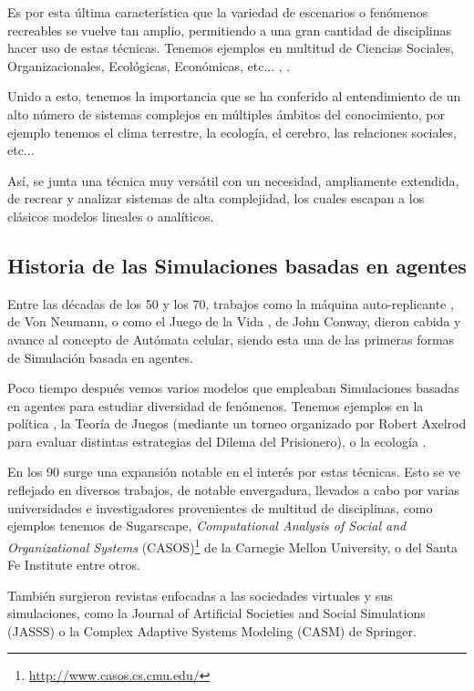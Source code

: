 Es por esta última característica que la variedad de escenarios o fenómenos recreables se vuelve tan amplio, permitiendo a una gran cantidad de disciplinas hacer uso de estas técnicas. Tenemos ejemplos en multitud de Ciencias Sociales, Organizacionales, Ecológicas, Económicas, etc... \citep{troitzsch2009perspectives}, \citep{heckbert2010agent}.

Unido a esto, tenemos la importancia que se ha conferido al entendimiento de un alto número de sistemas complejos en múltiples ámbitos del conocimiento, por ejemplo tenemos el clima terrestre, la ecología, el cerebro, las relaciones sociales, etc...

Así, se junta una técnica muy versátil con un necesidad, ampliamente extendida, de recrear y analizar sistemas de alta complejidad, los cuales escapan a los clásicos modelos lineales o analíticos.

\subsection{Historia de las Simulaciones basadas en agentes}

Entre las décadas de los 50 y los 70, trabajos como la máquina auto-replicante \citep{neumann1966theory} , de Von Neumann, o como el Juego de la Vida \citep{gardner1970fantastic}, de John Conway, dieron cabida y avance al concepto de Autómata celular, siendo esta una de las primeras formas de Simulación basada en agentes.

Poco tiempo después vemos varios modelos que empleaban Simulaciones basadas en agentes para estudiar diversidad de fenómenos. Tenemos ejemplos en la política \citep{schelling1971dynamic}, la Teoría de Juegos (mediante un torneo organizado por Robert Axelrod para evaluar distintas estrategias del Dilema del Prisionero), o la ecología \citep{hogeweg1983ontogeny}.

En los 90 surge una expansión notable en el interés por estas técnicas. Esto se ve reflejado en diversos trabajos, de notable envergadura, llevados a cabo por varias universidades e investigadores provenientes de multitud de disciplinas, como ejemplos tenemos \cite{epstein1996growing} de Sugarscape, \textit{Computational Analysis of Social and Organizational Systems} (CASOS)\footnote{\url{http://www.casos.cs.cmu.edu/}} de la Carnegie Mellon University, o \cite{kohler2000dynamics} del Santa Fe Institute  entre otros.

También surgieron revistas enfocadas a las sociedades virtuales y sus simulaciones, como la Journal of Artificial Societies and Social Simulations (JASSS) o la Complex Adaptive Systems Modeling (CASM) de Springer.

